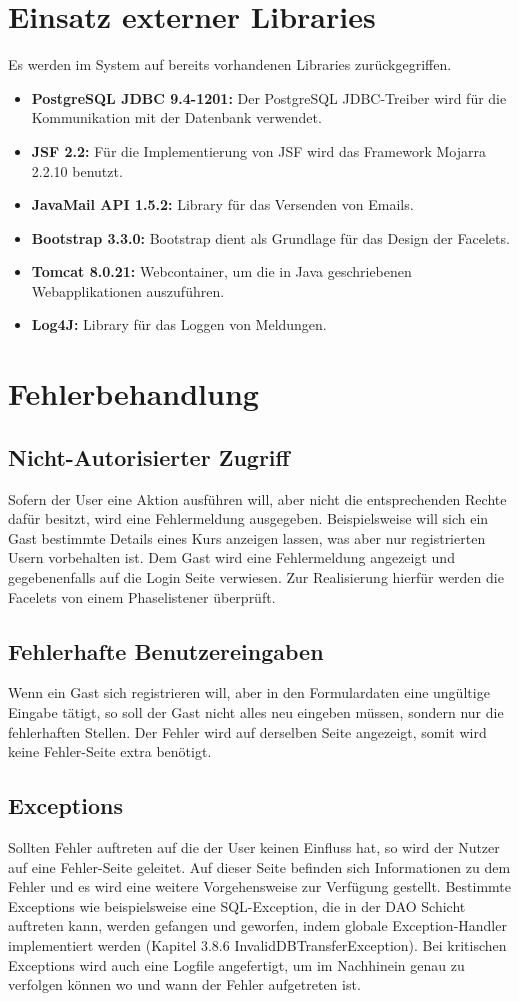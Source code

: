 \section{Einsatz externer Libraries}
Es werden im System auf bereits vorhandenen Libraries zurückgegriffen.
	\begin{itemize}
		\item \textbf{PostgreSQL JDBC 9.4-1201:} Der PostgreSQL JDBC-Treiber wird für die Kommunikation mit der Datenbank verwendet.
		\item \textbf{JSF 2.2:} Für die Implementierung von JSF wird das Framework Mojarra 2.2.10 benutzt.
		\item \textbf{JavaMail API 1.5.2:} Library für das Versenden von Emails.
		\item \textbf{Bootstrap 3.3.0:} Bootstrap dient als Grundlage für das Design der Facelets.
		\item \textbf{Tomcat 8.0.21:} Webcontainer, um die in Java geschriebenen Webapplikationen auszuführen.
		\item \textbf{Log4J:} Library für das Loggen von Meldungen.
	\end{itemize}
\section{Fehlerbehandlung}
	\subsection{Nicht-Autorisierter Zugriff}
	Sofern der User eine Aktion ausführen will, aber nicht die entsprechenden Rechte dafür besitzt, wird eine Fehlermeldung ausgegeben. Beispielsweise will sich ein Gast bestimmte Details eines Kurs anzeigen lassen, was aber nur registrierten Usern vorbehalten ist. Dem Gast wird eine Fehlermeldung angezeigt und gegebenenfalls auf die Login Seite verwiesen. Zur Realisierung hierfür werden die Facelets von einem Phaselistener überprüft.
	\subsection{Fehlerhafte Benutzereingaben}
	Wenn ein Gast sich registrieren will, aber in den Formulardaten eine ungültige Eingabe tätigt, so soll der Gast nicht alles neu eingeben müssen, sondern nur die fehlerhaften Stellen. Der Fehler wird auf derselben Seite angezeigt, somit wird keine Fehler-Seite extra benötigt.
	\subsection{Exceptions}
	Sollten Fehler auftreten auf die der User keinen Einfluss hat, so wird der Nutzer auf eine Fehler-Seite geleitet. Auf dieser Seite befinden sich Informationen zu dem Fehler und es wird eine weitere Vorgehensweise zur Verfügung gestellt. Bestimmte Exceptions wie beispielsweise eine SQL-Exception, die in der DAO Schicht auftreten kann, werden gefangen und geworfen, indem globale Exception-Handler implementiert werden (Kapitel 3.8.6 InvalidDBTransferException). Bei kritischen Exceptions wird auch eine Logfile angefertigt, um im Nachhinein genau zu verfolgen können wo und wann der Fehler aufgetreten ist.
